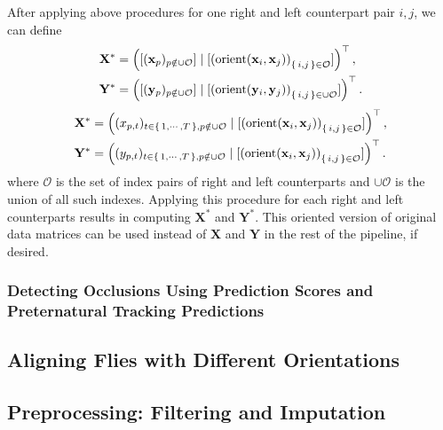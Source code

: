 After applying above procedures for one right and left counterpart pair $i, j$, we can define
\begin{align*}
	\mathbf{X}^{\ast} & = \left([(\mathbf{x}_p)_{p \notin \cup\mathcal{O}}] \mid [\left(\mathop{\rm{orient}}(\mathbf{x}_i, \mathbf{x}_j)\right)_{\{\,i,j\,\} \in \mathcal{O}}]\right)^\top,      \\
	\mathbf{Y}^{\ast} & = \left([(\mathbf{y}_p)_{p \notin \cup\mathcal{O}}] \mid [\left(\mathop{\rm{orient}}(\mathbf{y}_i, \mathbf{y}_j)\right)_{\{\,i,j\,\} \in \cup \mathcal{O}}]\right)^\top. \\
\end{align*}
\begin{align*}
	\mathbf{X}^{\ast} & =\left( (x_{p,t})_{t \in \{\,1, \cdots, T\,\}, p \notin \cup \mathcal{O}} \mid [\left(\mathop{\rm{orient}}(\mathbf{x}_i, \mathbf{x}_j)\right)_{\{\,i,j\,\} \in \mathcal{O}}]\right)^\top,   \\
	\mathbf{Y}^{\ast} & = \left((y_{p,t})_{t \in \{\,1, \cdots, T\,\}, p \notin \cup \mathcal{O}}  \mid  [\left(\mathop{\rm{orient}}(\mathbf{x}_i, \mathbf{x}_j)\right)_{\{\,i,j\,\} \in \mathcal{O}}]\right)^\top. \\
\end{align*}
where $\mathcal{O}$ is the set of index pairs of right and left counterparts and $\cup \mathcal{O}$ is the union of all such indexes.
Applying this procedure for each right and left counterparts results in computing $\mathbf{X}^{\ast}$ and $\mathbf{Y}^{\ast}$.
This oriented version of original data matrices can be used instead of $\mathbf{X}$ and $\mathbf{Y}$ in the rest of the pipeline, if desired.

\subsubsection{Detecting Occlusions Using Prediction Scores and Preternatural Tracking Predictions}

\subsection{Aligning Flies with Different Orientations}

\subsection{Preprocessing: Filtering and Imputation}

